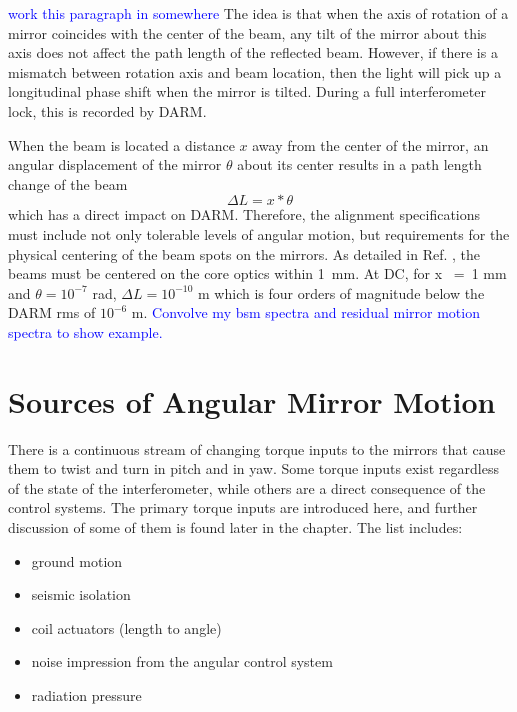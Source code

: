 \textcolor{blue}{work this paragraph in somewhere}
The idea is that when the axis of rotation of a mirror coincides with the center of the beam, any tilt of the mirror about this axis does not affect the path length of the reflected beam. However, if there is a mismatch between rotation axis and beam location, then the light will pick up a longitudinal phase shift when the mirror is tilted. During a full interferometer lock, this is recorded by DARM.



When the beam is located a distance $x$ away from the center of the mirror, an
angular displacement of the mirror $\theta$ about its center results in a path
length change of the beam
\begin{equation}
\Delta{L} = x * \theta
\end{equation}
which has a direct impact on DARM. Therefore, the alignment specifications must include not only tolerable levels of angular motion, but requirements for the physical centering of the beam spots on the mirrors. As detailed in Ref. \cite{ISCGroup1998ASC}, the beams must be centered on the core optics within 1~mm. At DC, for x ~=~1 mm and $\theta = 10^{-7}$ rad, $\Delta{L} = 10^{-10}$ m which is four orders of magnitude below the DARM rms of $10^{-6}$ m. \textcolor{blue}{Convolve my bsm spectra and residual mirror motion spectra to show example.}




\section{Sources of Angular Mirror Motion}
There is a continuous stream of changing torque inputs to the mirrors that cause them to twist and turn in pitch and in yaw. Some torque inputs exist regardless of the state of the interferometer, while others are a direct consequence of the control systems. The primary torque inputs are introduced here, and further discussion of some of them is found later in the chapter. The list includes:
\begin{itemize}
\item ground motion \vspace{-10pt} 
\item seismic isolation \vspace{-10pt} 
\item coil actuators (length to angle) \vspace{-10pt}
\item noise impression from the angular control system \vspace{-10pt}
\item radiation pressure
\end{itemize}




